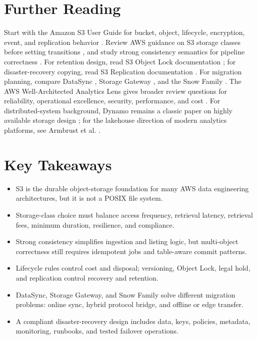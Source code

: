 \section{Further Reading}
Start with the Amazon S3 User Guide for bucket, object, lifecycle, encryption, event, and replication behavior \cite{awsS3UserGuide}. Review AWS guidance on S3 storage classes before setting transitions \cite{awsS3StorageClasses}, and study strong consistency semantics for pipeline correctness \cite{awsS3Consistency}. For retention design, read S3 Object Lock documentation \cite{awsS3ObjectLock}; for disaster-recovery copying, read S3 Replication documentation \cite{awsS3Replication}. For migration planning, compare DataSync \cite{awsDataSyncGuide}, Storage Gateway \cite{awsStorageGatewayGuide}, and the Snow Family \cite{awsSnowFamilyGuide}. The AWS Well-Architected Analytics Lens gives broader review questions for reliability, operational excellence, security, performance, and cost \cite{awsWellArchitectedAnalytics}. For distributed-system background, Dynamo remains a classic paper on highly available storage design \cite{decandia2007dynamo}; for the lakehouse direction of modern analytics platforms, see Armbrust et al. \cite{armbrust2021lakehouse}.

\section*{Key Takeaways}
\begin{itemize}
    \item S3 is the durable object-storage foundation for many AWS data engineering architectures, but it is not a POSIX file system.
    \item Storage-class choice must balance access frequency, retrieval latency, retrieval fees, minimum duration, resilience, and compliance.
    \item Strong consistency simplifies ingestion and listing logic, but multi-object correctness still requires idempotent jobs and table-aware commit patterns.
    \item Lifecycle rules control cost and disposal; versioning, Object Lock, legal hold, and replication control recovery and retention.
    \item DataSync, Storage Gateway, and Snow Family solve different migration problems: online sync, hybrid protocol bridge, and offline or edge transfer.
    \item A compliant disaster-recovery design includes data, keys, policies, metadata, monitoring, runbooks, and tested failover operations.
\end{itemize}

